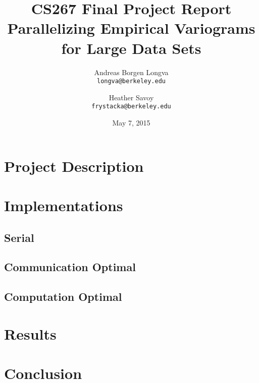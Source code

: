 \documentclass[11pt, oneside,titlepage]{article}   	%
\title{CS267 Final Project Report\\
  \large Parallelizing Empirical Variograms for Large Data Sets}
\author{Andreas Borgen Longva\\
  \texttt{longva@berkeley.edu}
  \and
  Heather Savoy\\
  \texttt{frystacka@berkeley.edu}}
\date{May 7, 2015}							%
\begin{document}
\maketitle
\section{Project Description}


\section{Implementations}
  \subsection{Serial}
    
  \subsection{Communication Optimal}
    
  \subsection{Computation Optimal}
   
   
\section{Results}
  

\section{Conclusion}
   



\end{document}
